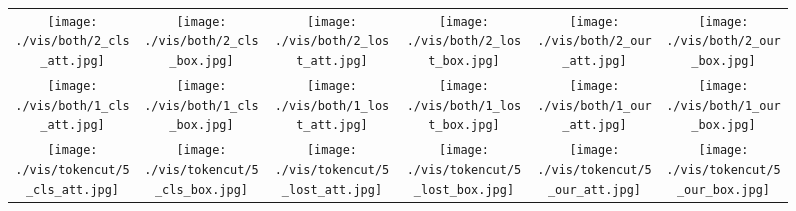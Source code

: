 \documentclass[twocolumn]{article}
\begin{document}
\begin{figure*}[!t]
\begin{tabular}{c@{\hskip 1.3pt}c@{\hskip 1.3pt}c@{\hskip 1.3pt}c@{\hskip 1.3pt}c@{\hskip 1.3pt}c}

        \texttt{[image: ./vis/both/2\_cls\_att.jpg]} &
		\texttt{[image: ./vis/both/2\_cls\_box.jpg]} &
		\texttt{[image: ./vis/both/2\_lost\_att.jpg]} &
		\texttt{[image: ./vis/both/2\_lost\_box.jpg]} &
		\texttt{[image: ./vis/both/2\_our\_att.jpg]} &
		\texttt{[image: ./vis/both/2\_our\_box.jpg]} \\ 
		
		\texttt{[image: ./vis/both/1\_cls\_att.jpg]} & 
		\texttt{[image: ./vis/both/1\_cls\_box.jpg]} &
		\texttt{[image: ./vis/both/1\_lost\_att.jpg]} &
		\texttt{[image: ./vis/both/1\_lost\_box.jpg]} &
		\texttt{[image: ./vis/both/1\_our\_att.jpg]} &
		\texttt{[image: ./vis/both/1\_our\_box.jpg]} \\
		
		\texttt{[image: ./vis/tokencut/5\_cls\_att.jpg]} &
		\texttt{[image: ./vis/tokencut/5\_cls\_box.jpg]} &
		\texttt{[image: ./vis/tokencut/5\_lost\_att.jpg]} &
		\texttt{[image: ./vis/tokencut/5\_lost\_box.jpg]} &
		\texttt{[image: ./vis/tokencut/5\_our\_att.jpg]} &
		\texttt{[image: ./vis/tokencut/5\_our\_box.jpg]} \\
		

\end{tabular}
\end{figure*}
\end{document}
